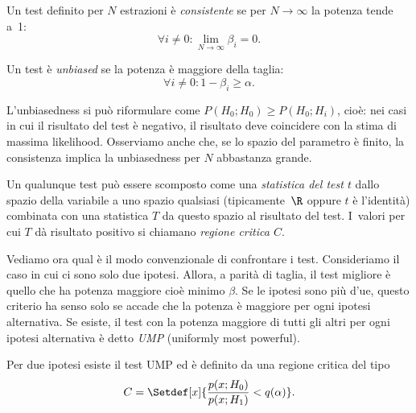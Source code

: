 \begin{definition}[Consistenza]
	Un test definito per $N$ estrazioni è \emph{consistente}
	se per $N\to\infty$ la potenza tende a~1:
	\begin{equation*}
		\forall i\neq0:
		\lim_{N\to\infty} \beta_i = 0.
	\end{equation*}
\end{definition}

\begin{definition}[Unbiasedness]
	Un test è \emph{unbiased}
	se la potenza è maggiore della taglia:
	\begin{equation*}
		\forall i\neq0:
		1-\beta_i \ge \alpha.
	\end{equation*}
\end{definition}

L'unbiasedness si può riformulare come $P(H_0;H_0)\ge P(H_0;H_i)$,
cioè: nei casi in cui il risultato del test è negativo,
il risultato deve coincidere con la stima di massima likelihood.
Osserviamo anche che,
se lo spazio del parametro è finito,
la consistenza implica la unbiasedness per $N$ abbastanza grande.

\begin{definition}	
	Un qualunque test può essere scomposto come una \emph{statistica del test $t$}
	dallo spazio della variabile a uno spazio qualsiasi (tipicamente~$\R$ oppure $t$ è l'identità)
	combinata con una statistica $T$ da questo spazio al risultato del test.
	I~valori per cui $T$ dà risultato positivo si chiamano \emph{regione critica $C$}.
\end{definition}

Vediamo ora qual è il modo convenzionale di confrontare i test.
Consideriamo il caso in cui ci sono solo due ipotesi.
Allora, a parità di taglia,
il test migliore è quello che ha potenza maggiore cioè minimo $\beta$.
Se le ipotesi sono più d'ue,
questo criterio ha senso solo se accade che la potenza è maggiore per ogni ipotesi alternativa.
Se esiste, il test con la potenza maggiore di tutti gli altri per ogni ipotesi alternativa è detto
\emph{UMP} (uniformly most powerful).

\begin{theorem}
	\label{th:np}
	Per due ipotesi esiste il test UMP
	ed è definito da una regione critica del tipo
	\begin{equation*}
		C = \Setdef[x]{\frac{p(x;H_0)}{p(x;H_1)} < q(\alpha)}.
	\end{equation*}
\end{theorem}

